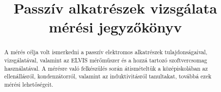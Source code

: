 \documentclass[10pt, conference,a4paper]{ITKproc}
\begin{document}
\title{Passzív alkatrészek vizsgálata mérési jegyzőkönyv}
\author{
}


\maketitle

\begin{abstract}
A mérés célja volt ismerkedni a passzív elektromos alkatrészek tulajdonságaival, vizsgálatával, valamint az ELVIS mérőműszer és a hozzá tartozó szoftvercsomag használatával. A mérésre való felkészülés során átismételtük a középiskolában az ellenállásról, kondenzátorról, valamint az induktivitásról tanultakat, továbbá ezek mérési lehetőségeit. 
\end{abstract}

\IEEEpeerreviewmaketitle
\end{document}
